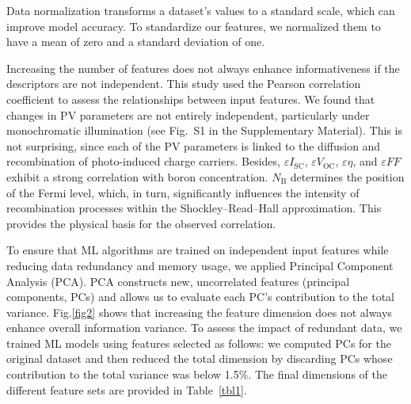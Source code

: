 \documentclass[a4paper,fleqn]{cas-sc}
\begin{document}
Data normalization transforms a dataset's values to a standard scale, which can improve model accuracy.
To standardize our features, we normalized them to have a mean of zero and a standard deviation of one.

Increasing the number of features does not always enhance informativeness if the descriptors are not independent.
This study used the Pearson correlation coefficient to assess the relationships between input features.
We found that changes in PV parameters are not entirely independent, particularly under monochromatic illumination
(see Fig.~S1 in the Supplementary Material).
This is not surprising, since each of the PV parameters is linked to the diffusion and recombination of photo-induced charge carriers.
Besides,
$\varepsilon I_\mathrm{SC}$, $\varepsilon V_\mathrm{OC}$, $\varepsilon \eta$, and $\varepsilon F\!F$
exhibit a strong correlation with boron concentration.
$N_\mathrm{B}$ determines the position of the Fermi level, which, in turn, significantly influences
the intensity of recombination processes within the Shockley–Read–Hall approximation.
This provides the physical basis for the observed correlation.

To ensure that ML algorithms are trained on independent input features while reducing data redundancy and memory usage,
we applied Principal Component Analysis (PCA).
PCA constructs new, uncorrelated features (principal components, PCs) and allows us to evaluate each PC's contribution to the total variance.
Fig.\ref{fig2} shows that increasing the feature dimension does not always enhance overall information variance.
To assess the impact of redundant data, we trained ML models using features selected as follows:
we computed PCs for the original dataset and then reduced the total dimension
by discarding PCs whose contribution to the total variance was below 1.5\%.
The final dimensions of the different feature sets are provided in Table~\ref{tbl1}.
\end{document}
